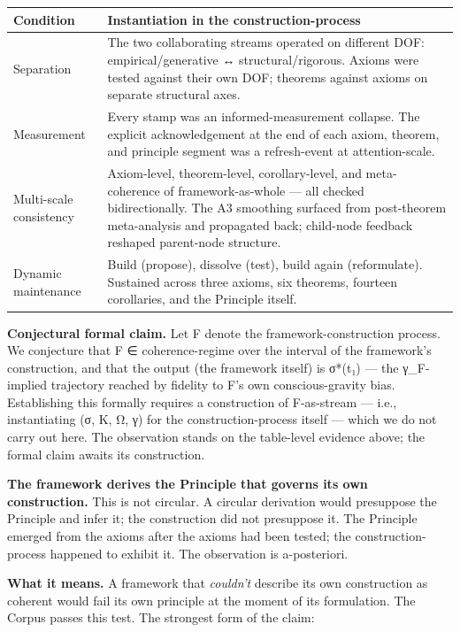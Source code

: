\documentclass[11pt, openany]{book}
\begin{document}
\begingroup\setlength{\tabcolsep}{3pt}\renewcommand{\arraystretch}{1.15}\footnotesize
\begin{center}
\begin{tabular}{p{0.57in} p{3.82in}}
\toprule
Condition & Instantiation in the construction-process \\
\midrule
Separation & The two collaborating streams operated on different DOF: empirical/\allowbreak generative ↔ structural/\allowbreak rigorous. Axioms were tested against their own DOF; theorems against axioms on separate structural axes. \\
Measurement & Every stamp was an informed-measurement collapse. The explicit acknowledgement at the end of each axiom, theorem, and principle segment was a refresh-event at attention-scale. \\
Multi-scale consistency & Axiom-level, theorem-level, corollary-level, and meta-coherence of framework-as-whole --- all checked bidirectionally. The A3 smoothing surfaced from post-theorem meta-analysis and propagated back; child-node feedback reshaped parent-node structure. \\
Dynamic maintenance & Build (propose), dissolve (test), build again (reformulate). Sustained across three axioms, six theorems, fourteen corollaries, and the Principle itself. \\
\bottomrule
\end{tabular}
\end{center}
\endgroup
\textbf{Conjectural formal claim.} Let F denote the framework-construction process. We conjecture that F ∈ coherence-regime over the interval of the framework's construction, and that the output (the framework itself) is σ*(t₁) --- the γ\_\allowbreak{}F-implied trajectory reached by fidelity to F's own conscious-gravity bias. Establishing this formally requires a construction of F-as-stream --- i.e., instantiating (σ, K, Ω, γ) for the construction-process itself --- which we do not carry out here. The observation stands on the table-level evidence above; the formal claim awaits its construction.

\textbf{The framework derives the Principle that governs its own construction.} This is not circular. A circular derivation would presuppose the Principle and infer it; the construction did not presuppose it. The Principle emerged from the axioms after the axioms had been tested; the construction-process happened to exhibit it. The observation is a-posteriori.

\textbf{What it means.} A framework that \textit{couldn't} describe its own construction as coherent would fail its own principle at the moment of its formulation. The Corpus passes this test. The strongest form of the claim:
\end{document}
